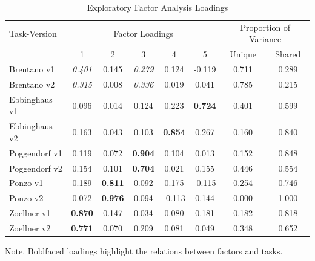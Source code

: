 \documentclass[man, 12pt]{apa7} %
\begin{document}
\begin{table}[htbp]
    \centering
    \caption{Exploratory Factor Analysis Loadings}
    \label{tab:Fac-10}
    \begin{threeparttable}
        \begin{tabular}{l|ccccc|cc}
            \toprule
            Task-Version
            & \multicolumn{5}{c|}{Factor Loadings} & \multicolumn{2}{c}{Proportion of Variance} \\
            \cmidrule{2-8}
             & 1 & 2 & 3 & 4 & 5 & Unique & Shared \\
            \midrule
            Brentano v1 & \textit{0.401} & 0.145 & \textit{0.279} & 0.124 & -0.119 & 0.711 & 0.289 \\
            Brentano v2 & \textit{0.315} & 0.008 & \textit{0.336} & 0.019 & 0.041 & 0.785 & 0.215 \\
            Ebbinghaus v1 & 0.096 & 0.014 & 0.124 & 0.223 & \textbf{0.724} & 0.401 & 0.599 \\
            Ebbinghaus v2 & 0.163 & 0.043 & 0.103 & \textbf{0.854} & 0.267 & 0.160 & 0.840 \\
            Poggendorf v1 & 0.119 & 0.072 & \textbf{0.904} & 0.104 & 0.013 & 0.152 & 0.848 \\
            Poggendorf v2 & 0.154 & 0.101 & \textbf{0.704} & 0.021 & 0.155 & 0.446 & 0.554 \\
            Ponzo v1 & 0.189 & \textbf{0.811} & 0.092 & 0.175 & -0.115 & 0.254 & 0.746 \\
            Ponzo v2 & 0.072 & \textbf{0.976} & 0.094 & -0.113 & 0.144 & 0.000 & 1.000 \\
            Zoellner v1 & \textbf{0.870} & 0.147 & 0.034 & 0.080 & 0.181 & 0.182 & 0.818 \\
            Zoellner v2 & \textbf{0.771} & 0.070 & 0.209 & 0.081 & 0.049 & 0.348 & 0.652 \\
            \bottomrule
        \end{tabular}
        \vspace{5pt}
        \begin{tablenotes}
            \small
            \item Note. Boldfaced loadings highlight the relations between factors and tasks.
        \end{tablenotes}
    \end{threeparttable}
\end{table}
\end{document}
